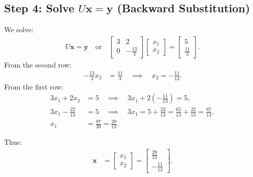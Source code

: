 \documentclass[journal]{IEEEtran}
\begin{document}
	\subsection*{Step 4: Solve $U\mathbf{x} = \mathbf{y}$ (Backward Substitution)}
	We solve:
	\begin{align}
		U\mathbf{x} = \mathbf{y} \quad \text{or} \quad \begin{bmatrix} 3 & 2 \\ 0 & -\frac{13}{3} \end{bmatrix} \begin{bmatrix} x_1 \\ x_2 \end{bmatrix} = \begin{bmatrix} 5 \\ \frac{11}{3} \end{bmatrix}.
	\end{align}
	From the second row:
	\begin{align}
		-\frac{13}{3} x_2 &= \frac{11}{3} \quad \implies \quad x_2 = -\frac{11}{13}.
	\end{align}
	From the first row:
	\begin{align}
		3x_1 + 2x_2 &= 5 \quad \implies \quad 3x_1 + 2 \left( -\frac{11}{13} \right) = 5, \\
		3x_1 - \frac{22}{13} &= 5 \quad \implies \quad 3x_1 = 5 + \frac{22}{13} = \frac{65}{13} + \frac{22}{13} = \frac{87}{13}, \\
		x_1 &= \frac{87}{39} = \frac{29}{13}.
	\end{align}
	
	Thus:
	\begin{align}
		\mathbf{x} &= \begin{bmatrix} x_1 \\ x_2 \end{bmatrix} = \begin{bmatrix} \frac{29}{13} \\ -\frac{11}{13} \end{bmatrix}.
	\end{align}
	
\end{document}
